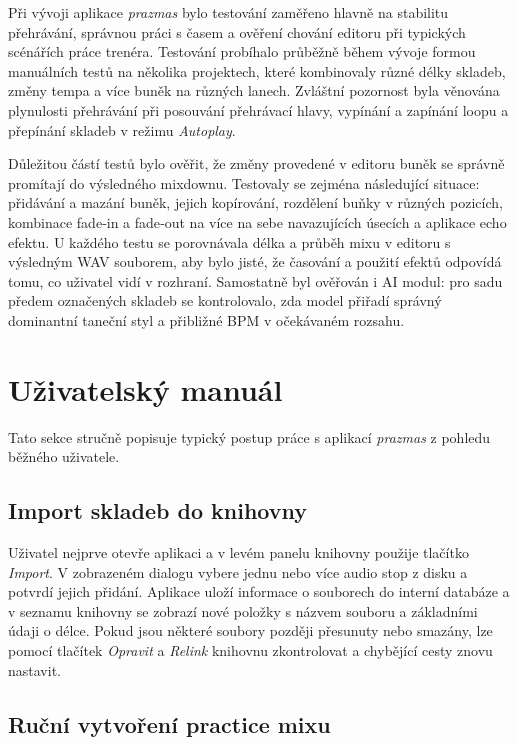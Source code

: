 \documentclass[12pt, a4paper,
]{report}
\begin{document}
Při vývoji aplikace \textit{prazmas} bylo testování zaměřeno hlavně na stabilitu přehrávání, správnou práci s časem a ověření chování editoru při typických scénářích práce trenéra. Testování probíhalo průběžně během vývoje formou manuálních testů na několika projektech, které kombinovaly různé délky skladeb, změny tempa a více buněk na různých lanech. Zvláštní pozornost byla věnována plynulosti přehrávání při posouvání přehrávací hlavy, vypínání a zapínání loopu a přepínání skladeb v režimu \emph{Autoplay}.

Důležitou částí testů bylo ověřit, že změny provedené v editoru buněk se správně promítají do výsledného mixdownu. Testovaly se zejména následující situace: přidávání a mazání buněk, jejich kopírování, rozdělení buňky v různých pozicích, kombinace fade‑in a fade‑out na více na sebe navazujících úsecích a aplikace echo efektu. U každého testu se porovnávala délka a průběh mixu v editoru s výsledným WAV souborem, aby bylo jisté, že časování a použití efektů odpovídá tomu, co uživatel vidí v rozhraní. Samostatně byl ověřován i AI modul: pro sadu předem označených skladeb se kontrolovalo, zda model přiřadí správný dominantní taneční styl a přibližné BPM v očekávaném rozsahu.

\section{Uživatelský manuál}

Tato sekce stručně popisuje typický postup práce s aplikací \textit{prazmas} z pohledu běžného uživatele.

\subsection*{Import skladeb do knihovny}

Uživatel nejprve otevře aplikaci a v levém panelu knihovny použije tlačítko \emph{Import}. V zobrazeném dialogu vybere jednu nebo více audio stop z disku a potvrdí jejich přidání. Aplikace uloží informace o souborech do interní databáze a v seznamu knihovny se zobrazí nové položky s názvem souboru a základními údaji o délce. Pokud jsou některé soubory později přesunuty nebo smazány, lze pomocí tlačítek \emph{Opravit} a \emph{Relink} knihovnu zkontrolovat a chybějící cesty znovu nastavit.
\newpage
\subsection*{Ruční vytvoření practice mixu}
\end{document}
